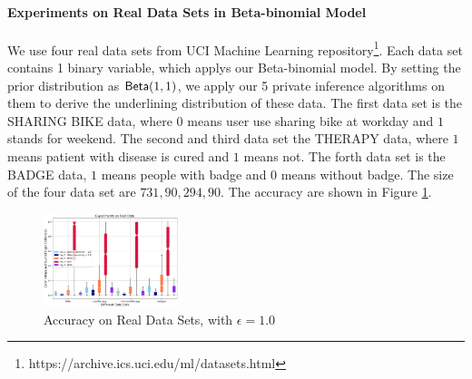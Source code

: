 \documentclass{article}
\begin{document}


\paragraph{Experiments on Real Data Sets in Beta-binomial Model}
We use four real data sets from UCI Machine Learning repository\footnote{https://archive.ics.uci.edu/ml/datasets.html}. Each data set contains 1 binary variable, which applys our Beta-binomial model. By setting the prior distribution as $\mathsf{Beta}(1,1)$, we apply our 5 private inference algorithms on them to derive the underlining distribution of these data. The first data set is the SHARING BIKE data, where $0$ means user use sharing bike at workday and $1$ stands for weekend. The second and third data set the THERAPY data, where $1$ means patient with disease is cured and $1$ means not. The forth data set is the BADGE data, $1$ means people with badge and $0$ means without badge. The size of the four data set are $731, 90, 294, 90$. The accuracy are shown in Figure \ref{fig_real_2d}.
\begin{figure}
\centering
\includegraphics[width=0.35\textwidth]{realdata.eps}
\caption{Accuracy on Real Data Sets, with $\epsilon = 1.0$}
\label{fig_real_2d}
\end{figure}
\end{document}
